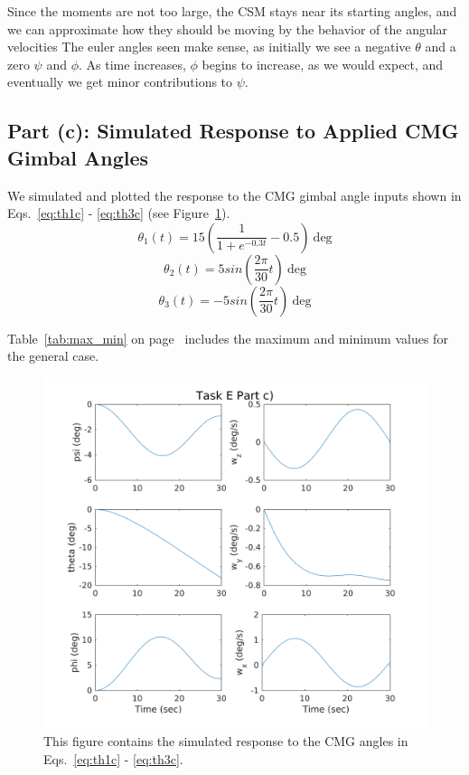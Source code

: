 \documentclass{article}
\begin{document}
Since the moments are not too large, the CSM stays near its starting angles, and we can approximate how they should be moving by the behavior of the angular velocities
The euler angles seen make sense, as initially we see a negative $\theta$ and a zero $\psi$ and $\phi$. As time increases, $\phi$ begins to increase, as we would expect, and eventually we get minor contributions to $\psi$. 

\subsection{Part (c): Simulated Response to Applied CMG Gimbal Angles}
We simulated and plotted the response to the CMG gimbal angle inputs shown in Eqs.~\ref{eq:th1c} - \ref{eq:th3c} (see Figure~\ref{fig:taske_c}).
\begin{equation}\label{eq:th1c}
    \theta_1(t) = 15 (\dfrac{1}{1 + e^{-0.3 t}} - 0.5) \:\text{deg}
\end{equation}
\begin{equation}\label{eq:th2c}
    \theta_2(t) = 5 sin(\dfrac{2 \pi}{30} t) \:\text{deg}
\end{equation}
\begin{equation}\label{eq:th3c}
    \theta_3(t) = -5 sin(\dfrac{2 \pi}{30} t) \:\text{deg}
\end{equation}

Table~\ref{tab:max_min} on page~\pageref{tab:max_min} includes the maximum and minimum values for the general case.

\begin{figure}[H]
  \includegraphics[width=\linewidth]{task_e_part_c.png}
  \caption{This figure contains the simulated response to the CMG angles in Eqs.~\ref{eq:th1c} - \ref{eq:th3c}.}
  \label{fig:taske_c}
\end{figure}
\end{document}
